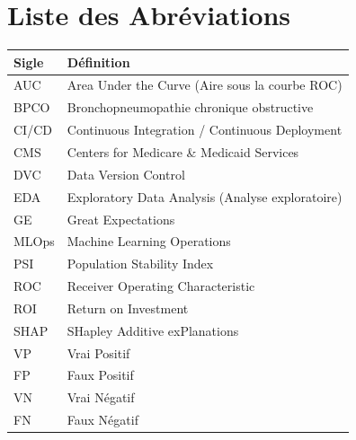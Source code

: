 \documentclass{rapportENSIAS}
\begin{document}
\chapter*{Liste des Abréviations}
\begin{tabular}{@{}lp{10cm}@{}}
\toprule
\textbf{Sigle} & \textbf{Définition} \\
\midrule
AUC  & Area Under the Curve (Aire sous la courbe ROC) \\
BPCO & Bronchopneumopathie chronique obstructive \\
CI/CD & Continuous Integration / Continuous Deployment \\
CMS  & Centers for Medicare \& Medicaid Services \\
DVC  & Data Version Control \\
EDA  & Exploratory Data Analysis (Analyse exploratoire) \\
GE   & Great Expectations \\
MLOps & Machine Learning Operations \\
PSI  & Population Stability Index \\
ROC  & Receiver Operating Characteristic \\
ROI  & Return on Investment \\
SHAP & SHapley Additive exPlanations \\
VP   & Vrai Positif \\
FP   & Faux Positif \\
VN   & Vrai Négatif \\
FN   & Faux Négatif \\
\bottomrule
\end{tabular}

\tabledematieres

\listoffigures
{}

\listoftables
{}








\newpage




\end{document}
